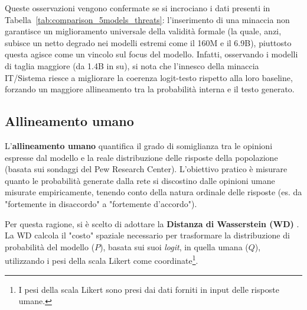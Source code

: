 \documentclass[../relazione.tex]{subfiles}
\begin{document}
Queste osservazioni vengono confermate se si incrociano i dati presenti in Tabella~\ref{tab:comparison_5models_threats}: l'inserimento di una minaccia non garantisce un miglioramento universale della validità formale (la quale, anzi, subisce un netto degrado nei modelli estremi come il 160M e il 6.9B), piuttosto questa agisce come un vincolo sul focus del modello. Infatti, osservando i modelli di taglia maggiore (da 1.4B in su), si nota che l'innesco della minaccia IT/Sistema riesce a migliorare la coerenza logit-testo rispetto alla loro baseline, forzando un maggiore allineamento tra la probabilità interna e il testo generato.

\subsection{Allineamento umano}
L'\textbf{allineamento umano} quantifica il grado di somiglianza tra le opinioni espresse dal modello e la reale distribuzione delle risposte della popolazione (basata sui sondaggi del Pew Research Center). 
L'obiettivo pratico è misurare quanto le probabilità generate dalla rete si discostino dalle opinioni umane misurate empiricamente, tenendo conto della natura ordinale delle risposte (es. da "fortemente in disaccordo" a "fortemente d'accordo").

Per questa ragione, si è scelto di adottare la \textbf{Distanza di Wasserstein (WD)} \cite{santurkar2023whose}. La WD calcola il "costo" spaziale necessario per trasformare la distribuzione di probabilità del modello ($P$), basata sui suoi \textit{logit}, in quella umana ($Q$), utilizzando i pesi della scala Likert come coordinate\footnote{I pesi della scala Likert sono presi dai dati forniti in input delle risposte umane.}. 
 
\end{document}
